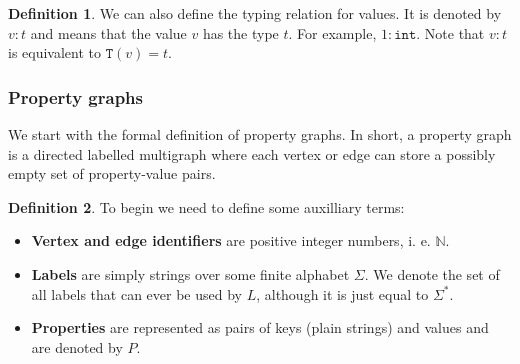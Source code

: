 \documentclass[14pt]{constructor-thesis}
\theoremstyle{definition}
\newtheorem{definition}{Definition}
\begin{document}
\begin{definition}
  We can also define the typing relation for values. It is denoted by $v : t$ and means that the value $v$ has the type $t$. For example, $1 : \mathtt{int}$. Note that $v : t$ is equivalent to $\mathtt{T}(v) = t$.
\end{definition}

\subsubsection{Property graphs}

We start with the formal definition of property graphs. In short, a property graph is a directed labelled multigraph where each vertex or edge can store a possibly empty set of property-value pairs. 

\begin{definition}
  To begin we need to define some auxilliary terms: 
  \begin{itemize}
    \item \textbf{Vertex and edge identifiers} are positive integer numbers, i. e. $\mathbb{N}$.
    \item \textbf{Labels} are simply strings over some finite alphabet $\Sigma$. We denote the set of all labels that can ever be used by $L$, although it is just equal to $\Sigma^*$.
    \item \textbf{Properties} are represented as pairs of keys (plain strings) and values and are denoted by $P$.
  \end{itemize}
\end{definition}
\end{document}
